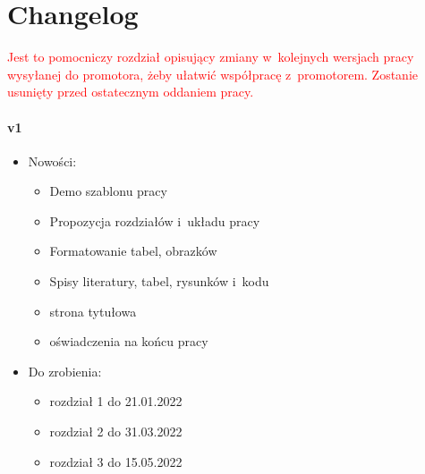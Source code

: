 \chapter*{Changelog}\label{ch:changelog}

\textcolor{red}{
Jest to pomocniczy rozdział opisujący zmiany w~kolejnych wersjach pracy wysyłanej do promotora, żeby ułatwić współpracę z~promotorem.
Zostanie usunięty przed ostatecznym oddaniem pracy.
}
\subsubsection{v1}
\begin{itemize}
    \item Nowości:
    \begin{itemize}
        \item Demo szablonu pracy
        \item Propozycja rozdziałów i~układu pracy
        \item Formatowanie tabel, obrazków
        \item Spisy literatury, tabel, rysunków i~kodu
        \item strona tytułowa
        \item oświadczenia na końcu pracy
    \end{itemize}
    \item Do zrobienia:
    \begin{itemize}
        \item rozdział 1 do 21.01.2022
        \item rozdział 2 do 31.03.2022
        \item rozdział 3 do 15.05.2022

\end{itemize}
\end{itemize}
